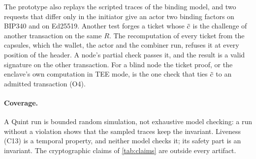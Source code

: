 The prototype also replays the scripted traces of the binding model, and two requests that differ only in the initiator give an actor two binding factors on BIP340 and on Ed25519. Another test forges a ticket whose $\tilde{c}$ is the challenge of another transaction on the same $R$. The recomputation of every ticket from the capsules, which the wallet, the actor and the combiner run, refuses it at every position of the header. A node's partial check passes it, and the result is a valid signature on the other transaction. For a blind node the ticket proof, or the enclave's own computation in TEE mode, is the one check that ties $\tilde{c}$ to an admitted transaction (O4).

\paragraph{Coverage.} A Quint run is bounded random simulation, not exhaustive model checking: a run without a violation shows that the sampled traces keep the invariant. Liveness (C13) is a temporal property, and neither model checks it; its safety part is an invariant. The cryptographic claims of \cref{tab:claims} are outside every artifact.
